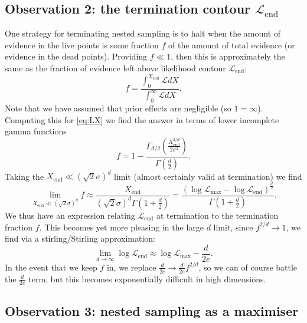 \documentclass[usenatbib]{mnras}
\begin{document}
\subsection*{Observation 2: the termination contour $\mathcal{L}_\mathrm{end}$}

One strategy for terminating nested sampling is to halt when the amount of evidence in the live points is some fraction $f$ of the amount of total evidence (or evidence in the dead points). Providing $f\ll 1$, then this is approximately the same as the fraction of evidence left above likelihood contour $\mathcal{L}_\mathrm{end}$:
\begin{equation}
    f = \frac{\int_0^{X_\mathrm{end}} \mathcal{L} dX}{\int_0^\infty \mathcal{L} dX}.
    \label{eq:fint}
\end{equation}
Note that we have assumed that prior effects are negligible (so $1=\infty$).
Computing this for \cref{eq:LX} we find the answer in terms of lower incomplete gamma functions
\begin{equation}
    f = 1- \frac{\Gamma_{d/2}(\frac{X_\mathrm{end}^{2/d}}{2\sigma^2})}{\Gamma(\frac{d}{2})}.
    \label{eq:f}
\end{equation}
Taking the $X_\mathrm{end}\ll (\sqrt{2}\sigma)^d$ limit (almost certainly valid at termination) we find
\begin{equation}
    \lim_{X_\mathrm{end}\ll (\sqrt{2}\sigma)^d} f \approx \frac{X_\mathrm{end}}{(\sqrt{2}\sigma)^d\Gamma(1+\frac{d}{2})} = \frac{(\log\mathcal{L}_\mathrm{max}-\log\mathcal{L}_\mathrm{end})^{\frac{d}{2}}}{\Gamma(1+\frac{d}{2})}.
\end{equation}
We thus have an expression relating $\mathcal{L}_\mathrm{end}$ at termination to the termination fraction $f$. This becomes yet more pleasing in the large $d$ limit, since $f^{2/d}\to 1$, we find via a stirling/Stirling approximation:
\begin{equation}
    \lim_{d\to\infty} \log\mathcal{L}_\mathrm{end} \approx \log\mathcal{L}_\mathrm{max} - \frac{d}{2e}.
\end{equation}
In the event that we keep $f$ in, we replace $\frac{d}{2e}\to \frac{d}{2e}f^{2/d}$, so we can of course battle the $\frac{d}{2e}$ term, but this becomes exponentially difficult in high dimensions.

\subsection*{Observation 3: nested sampling as a maximiser}
\end{document}
